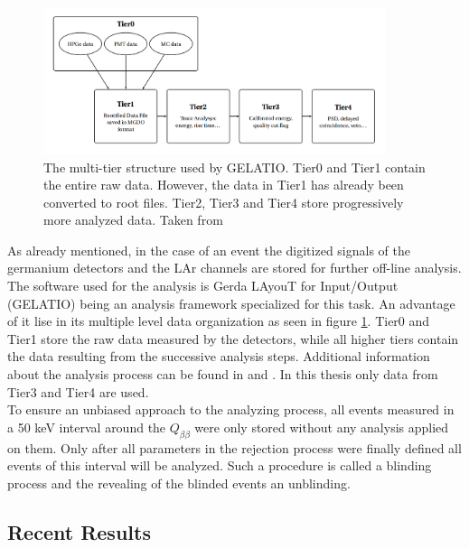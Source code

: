\documentclass[encoding=utf8,british]{tumphthesis}
\begin{document}
\label{sec:Resultsofgerda}
\begin{figure}[t!]
	\centering
		\includegraphics[width=100mm]{./Bilder/TierStructure.png}
		\caption{The multi-tier structure used by GELATIO. Tier0 and Tier1 contain the entire raw data. However, the data in Tier1 has already been converted to root files. Tier2, Tier3 and Tier4 store  progressively more analyzed data. Taken from \cite{agostini_gelatio:_2011}}
		\label{fig:TierStructure}
\end{figure}

As already mentioned, in the case of an event the digitized signals of the germanium detectors and the LAr channels are stored for further off-line analysis.
The software used for the analysis is Gerda LAyouT for Input/Output (GELATIO) being an analysis framework specialized for this task.
An advantage of it lise in its multiple level data organization as seen in figure \ref{fig:TierStructure}.
Tier0 and Tier1 store the raw data measured by the detectors, while all higher tiers contain the data resulting from the successive analysis steps.
Additional information about the analysis process can be found in \cite{agostini_gelatio:_2011} and \cite{agostini_off-line_2011}.
In this thesis only data from Tier3 and Tier4 are used.
\\

To ensure an unbiased approach to the analyzing process, all events measured in a  50 keV interval around the $Q_{\beta\beta}$ were only stored without any analysis applied on them.
Only after all parameters in the rejection process were finally defined all events of this interval will be analyzed. 
Such a procedure is called a blinding process and the revealing of the blinded events an unblinding. 
\\


\subsection{Recent Results}
\end{document}
